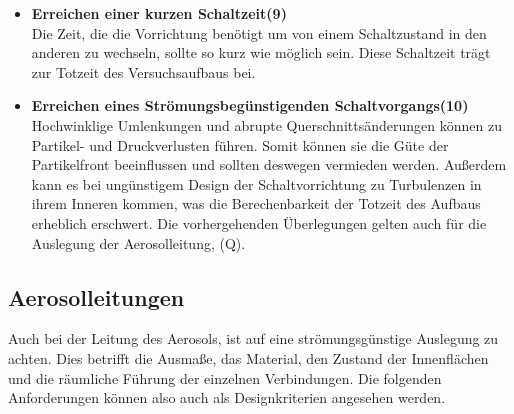 \begin{itemize}
\item \textbf{Erreichen einer kurzen Schaltzeit(9)}\\
Die Zeit, die die Vorrichtung ben\"{o}tigt um von einem Schaltzustand in den anderen zu wechseln, sollte so kurz wie m\"{o}glich sein. Diese Schaltzeit tr\"{a}gt zur Totzeit des Versuchsaufbaus bei. 
	
\item \textbf{Erreichen eines Str\"{o}mungsbeg\"{u}nstigenden Schaltvorgangs(10)}\\ 
Hochwinklige Umlenkungen und abrupte Querschnitts\"{a}nderungen k\"{o}nnen zu Partikel- und Druckverlusten f\"{u}hren. Somit k\"{o}nnen sie die G\"{u}te der Partikelfront beeinflussen und sollten deswegen vermieden werden. Außerdem kann es bei ung\"{u}nstigem Design der Schaltvorrichtung zu Turbulenzen in ihrem Inneren kommen, was die Berechenbarkeit der Totzeit des Aufbaus erheblich erschwert. Die vorhergehenden \"{U}berlegungen gelten auch f\"{u}r die Auslegung der Aerosolleitung, (Q).
\end{itemize}

\subsection{Aerosolleitungen}
Auch bei der Leitung des Aerosols, ist auf eine str\"{o}mungsg\"{u}nstige Auslegung zu achten. Dies betrifft die Ausma{\ss}e, das Material, den Zustand der Innenfl\"{a}chen und die r\"{a}umliche F\"{u}hrung der einzelnen Verbindungen. Die folgenden Anforderungen k\"{o}nnen also auch als Designkriterien angesehen werden.

